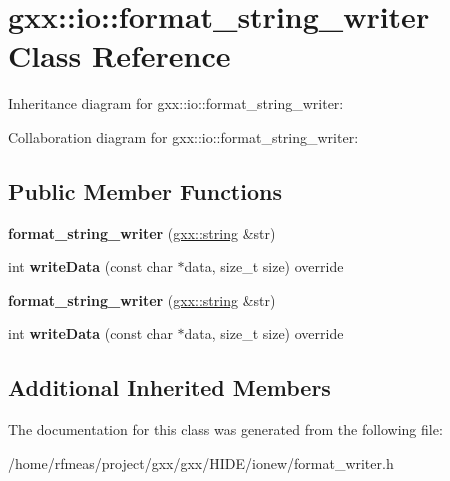 \hypertarget{classgxx_1_1io_1_1format__string__writer}{}\section{gxx\+:\+:io\+:\+:format\+\_\+string\+\_\+writer Class Reference}
\label{classgxx_1_1io_1_1format__string__writer}


Inheritance diagram for gxx\+:\+:io\+:\+:format\+\_\+string\+\_\+writer\+:


Collaboration diagram for gxx\+:\+:io\+:\+:format\+\_\+string\+\_\+writer\+:
\subsection*{Public Member Functions}
\begin{DoxyCompactItemize}
\item 
{\bfseries format\+\_\+string\+\_\+writer} (\hyperlink{classgxx_1_1basic__string}{gxx\+::string} \&str)\hypertarget{classgxx_1_1io_1_1format__string__writer_afbb0574f36f17bcbd516753e24c99677}{}\label{classgxx_1_1io_1_1format__string__writer_afbb0574f36f17bcbd516753e24c99677}

\item 
int {\bfseries write\+Data} (const char $\ast$data, size\+\_\+t size) override\hypertarget{classgxx_1_1io_1_1format__string__writer_abd272019808b81de6c3e006799da16c7}{}\label{classgxx_1_1io_1_1format__string__writer_abd272019808b81de6c3e006799da16c7}

\item 
{\bfseries format\+\_\+string\+\_\+writer} (\hyperlink{classgxx_1_1basic__string}{gxx\+::string} \&str)\hypertarget{classgxx_1_1io_1_1format__string__writer_afbb0574f36f17bcbd516753e24c99677}{}\label{classgxx_1_1io_1_1format__string__writer_afbb0574f36f17bcbd516753e24c99677}

\item 
int {\bfseries write\+Data} (const char $\ast$data, size\+\_\+t size) override\hypertarget{classgxx_1_1io_1_1format__string__writer_abd272019808b81de6c3e006799da16c7}{}\label{classgxx_1_1io_1_1format__string__writer_abd272019808b81de6c3e006799da16c7}

\end{DoxyCompactItemize}
\subsection*{Additional Inherited Members}


The documentation for this class was generated from the following file\+:\begin{DoxyCompactItemize}
\item 
/home/rfmeas/project/gxx/gxx/\+H\+I\+D\+E/ionew/format\+\_\+writer.\+h\end{DoxyCompactItemize}
